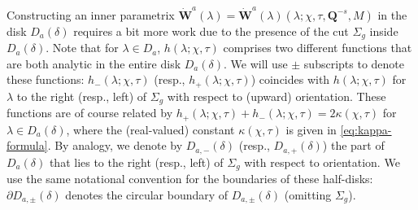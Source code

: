 Constructing an inner parametrix $\dot{\mathbf{W}}^a(\lambda)=\dot{\mathbf{W}}^a(\lambda)(\lambda;\chi,\tau,\mathbf{Q}^{-s},M)$ in the disk $D_a(\delta)$ requires a bit more work due to the presence of the cut $\Sigma_g$ inside $D_a(\delta)$. Note that for $\lambda\in D_a$, ${h}(\lambda;\chi,\tau)$ comprises two different functions that are both analytic in the entire disk $D_a(\delta)$. We will use $\pm$ subscripts to denote these functions: ${h}_{-}(\lambda;\chi,\tau)$ (resp., ${h}_{+}(\lambda;\chi,\tau)$) coincides with ${h}(\lambda;\chi,\tau)$ for $\lambda$ to the right (resp., left) of $\Sigma_g$ with respect to (upward) orientation. These functions are of course related by ${h}_+(\lambda;\chi,\tau) + {h}_-(\lambda;\chi,\tau) = 2 \kappa(\chi,\tau)$ for $ \lambda\in D_{a}(\delta)$,
where the (real-valued) constant $\kappa(\chi,\tau)$ is given in \eqref{eq:kappa-formula}. By analogy, we denote by $D_{a,-}(\delta)$ (resp., $D_{a,+}(\delta)$) the part of $D_a(\delta)$ that lies to the right (resp., left) of $\Sigma_g$ with respect to orientation. We use the same notational convention for the boundaries of these half-disks: $\partial D_{a,\pm}(\delta)$ denotes the circular boundary of $D_{a,\pm}(\delta)$ (omitting $\Sigma_g$).

